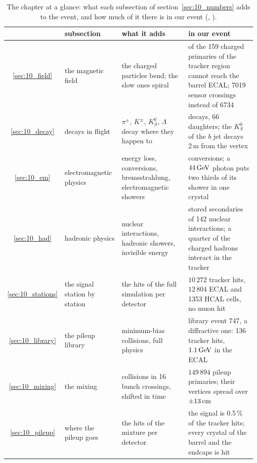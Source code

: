 \begin{table}[!htb]
\centering\small\setlength{\tabcolsep}{4pt}
\caption{The chapter at a glance: what each subsection of section~\ref{sec:10_numbers} adds to the event, and how
much of it there is in our event (, ).}
\label{tab:10_glance}
\begin{tabular}{@{}c>{\raggedright\arraybackslash}p{3.0cm}>{\raggedright\arraybackslash}p{5.8cm}>{\raggedright\arraybackslash}p{6.4cm}@{}}
\toprule
 & subsection & what it adds & in our event \\
\midrule
\ref{sec:10_field} & the magnetic field & the charged particles bend; the slow ones spiral & 114 of the 159 charged primaries of the tracker region cannot reach the barrel ECAL; 7019 sensor crossings instead of 6734 \\
\ref{sec:10_decay} & decays in flight & $\pi^\pm$, $K^\pm$, $K^0_S$, $\Lambda$ decay where they happen to & 41 decays, 66 daughters; the $K^0_S$ of the $b$ jet decays 2\,m from the vertex \\
\ref{sec:10_em} & electromagnetic physics & energy loss, conversions, bremsstrahlung, electromagnetic showers & 230 conversions; a $44\,\mathrm{GeV}$ photon puts two thirds of its shower in one crystal \\
\ref{sec:10_had} & hadronic physics & nuclear interactions, hadronic showers, invisible energy & 386 stored secondaries of 142 nuclear interactions; a quarter of the charged hadrons interact in the tracker \\
\ref{sec:10_stations} & the signal station by station & the hits of the full simulation per detector & $10\,272$ tracker hits, $12\,804$ ECAL and 1353 HCAL cells, no muon hit \\
\ref{sec:10_library} & the pileup library & 1000 minimum-bias collisions, full physics & library event 747, a diffractive one: 136 tracker hits, $1.1\,\mathrm{GeV}$ in the ECAL \\
\ref{sec:10_mixing} & the mixing & 995 collisions in 16 bunch crossings, shifted in time & $149\,894$ pileup primaries; their vertices spread over $\pm13\,\mathrm{cm}$ \\
\ref{sec:10_pileup} & where the pileup goes & the hits of the mixture per detector & the signal is 0.5\,\% of the tracker hits; every crystal of the barrel and the endcaps is hit \\
\bottomrule
\end{tabular}
\end{table}

